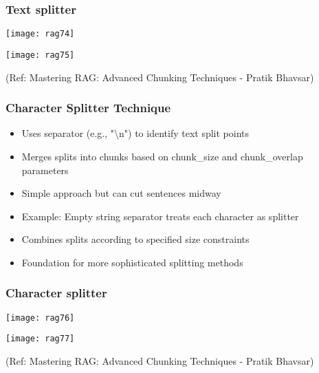 \begin{frame}[fragile]\frametitle{Text splitter}

  
  	\begin{center}
	\texttt{[image: rag74]}
	
	\texttt{[image: rag75]}
	
	{\tiny (Ref: Mastering RAG: Advanced Chunking Techniques - Pratik Bhavsar)}
	
	\end{center}
\end{frame}

\begin{frame}[fragile]\frametitle{Character Splitter Technique}
      \begin{itemize}
\item Uses separator (e.g., "\textbackslash n") to identify text split points
\item Merges splits into chunks based on chunk\_size and chunk\_overlap parameters
\item Simple approach but can cut sentences midway
\item Example: Empty string separator treats each character as splitter
\item Combines splits according to specified size constraints
\item Foundation for more sophisticated splitting methods
  \end{itemize}
\end{frame}

\begin{frame}[fragile]\frametitle{Character splitter}

  
  	\begin{center}
	\texttt{[image: rag76]}
	
	\texttt{[image: rag77]}
	
	{\tiny (Ref: Mastering RAG: Advanced Chunking Techniques - Pratik Bhavsar)}
	
	\end{center}
\end{frame}

